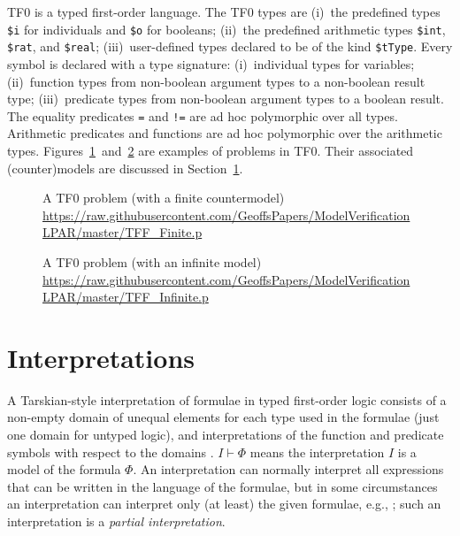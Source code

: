 \documentclass{easychair}
\newcommand{\smalltt}[1]{\small \texttt{#1}}
\begin{document}
TF0 is a typed first-order language.
The TF0 types are
(i)~the predefined types {\smalltt{\$i}} for individuals and {\smalltt{\$o}} for booleans; 
(ii)~the predefined arithmetic types {\smalltt{\$int}}, {\smalltt{\$rat}}, and {\smalltt{\$real}}; 
(iii)~user-defined types declared to be of the kind {\smalltt{\$tType}}.
Every symbol is declared with a type signature:
(i)~individual types for variables;
(ii)~function types from non-boolean argument types to a non-boolean result type;
(iii)~predicate types from non-boolean argument types to a boolean result.
The equality predicates {\tt =} and {\tt !=} are ad hoc polymorphic over all types. 
Arithmetic predicates and functions are ad hoc polymorphic over the arithmetic types.
Figures~\ref{TF0FiniteProblem}~and~\ref{TF0InfiniteProblem} are examples of problems in TF0.  Their associated (counter)models are discussed in Section~\ref{Interpretations}.

\begin{figure}[htbp]
\small
{}

\caption{A TF0 problem (with a finite countermodel)\\
{\footnotesize \url{https://raw.githubusercontent.com/GeoffsPapers/ModelVerificationLPAR/master/TFF_Finite.p}}}
\label{TF0FiniteProblem}
\end{figure}

\begin{figure}[htbp]
\small
{}

\caption{A TF0 problem (with an infinite model)\\
{\footnotesize \url{https://raw.githubusercontent.com/GeoffsPapers/ModelVerificationLPAR/master/TFF_Infinite.p}}}
\label{TF0InfiniteProblem}
\end{figure}

\section{Interpretations}
\label{Interpretations}

A Tarskian-style interpretation \cite{TV56} of formulae in typed first-order logic consists of a 
non-empty domain of unequal elements for each type used in the formulae (just one domain for 
untyped logic), and interpretations of the function and predicate symbols with respect to the 
domains \cite{Hun96,Gal15}.
$I \vdash \Phi$ means the interpretation $I$ is a model of the formula $\Phi$.
An interpretation can normally interpret all expressions that can be written in the language of 
the formulae, but in some circumstances an interpretation can interpret only (at least) the given 
formulae, e.g., \cite{BSW23}; such an interpretation is a {\em partial interpretation}.
\end{document}
